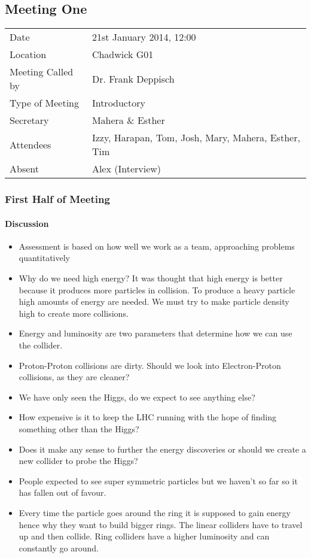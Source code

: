 \subsection{Meeting One}

\begin{tabular}{l l}
  Date & 21st January 2014, 12:00 \\
  Location & Chadwick G01 \\
  Meeting Called by & Dr. Frank Deppisch \\
  Type of Meeting & Introductory \\
  Secretary & Mahera \& Esther \\
  Attendees & Izzy, Harapan, Tom, Josh, Mary, Mahera, Esther, Tim \\
  Absent & Alex (Interview) \\  
\end{tabular}

\subsubsection{First Half of Meeting}

\paragraph{Discussion}
\begin{itemize}
  \item Assessment is based on how well we work as a team, approaching problems quantitatively
  \item Why do we need high energy? It was thought that high energy is better because it produces more particles in collision. To produce a heavy particle high amounts of energy are needed. We must try to make particle density high to create more collisions.
  \item Energy and luminosity are two parameters that determine how we can use the collider.
  \item Proton-Proton collisions are dirty. Should we look into Electron-Proton collisions, as they are cleaner?
  \item We have only seen the Higgs, do we expect to see anything else?
  \item How expensive is it to keep the LHC running with the hope of finding something other than the Higgs?
  \item Does it make any sense to further the energy discoveries or should we create a new collider to probe the Higgs?
  \item People expected to see super symmetric particles but we haven’t so far so it has fallen out of favour.
  \item Every time the particle goes around the ring it is supposed to gain energy hence why they want to build bigger rings. The linear colliders have to travel up and then collide. Ring colliders have a higher luminosity and can constantly go around.
\end{itemize}

